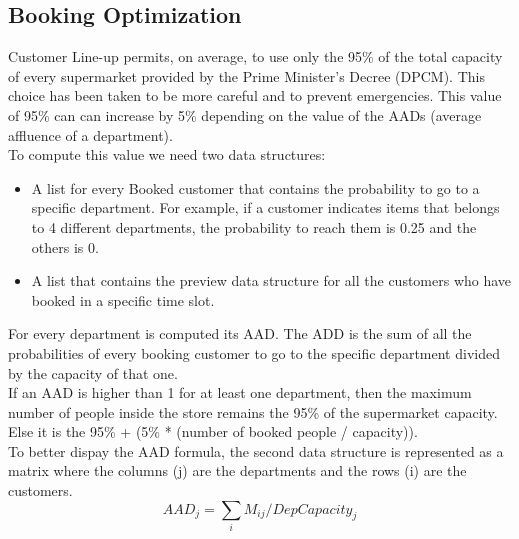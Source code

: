 \subsection{Booking Optimization}

Customer Line-up permits, on average, to use only the 95\% of the total capacity of every supermarket provided by the Prime Minister's Decree (DPCM). This choice has been taken to be more careful and to prevent emergencies. This value of 95\% can can increase by 5\% depending on the value of the AADs (average affluence of a department).\\
To compute this value we need two data structures:
\begin{itemize}
	\item A list for every Booked customer that contains the probability to go to a specific department. For example, if a customer indicates items that belongs to 4 different departments, the probability to reach them is 0.25 and the others is 0.
	\item A list that contains the preview data structure for all the customers who have booked in a specific time slot.
\end{itemize}
For every department is computed its AAD. The ADD is the sum of all the probabilities of every booking customer to go to the specific department divided by the capacity of that one.\\
If an AAD is higher than 1 for at least one department, then the maximum number of people inside the store remains the 95\% of the supermarket capacity. Else it is the 95\% + (5\% * (number of booked people / capacity)).\\
To better dispay the AAD formula, the second data structure is represented as a matrix where the columns (j) are the departments and the  rows (i) are the customers. \[AAD_{j} = \sum_i{M_{ij}} / DepCapacity_{j}\]


